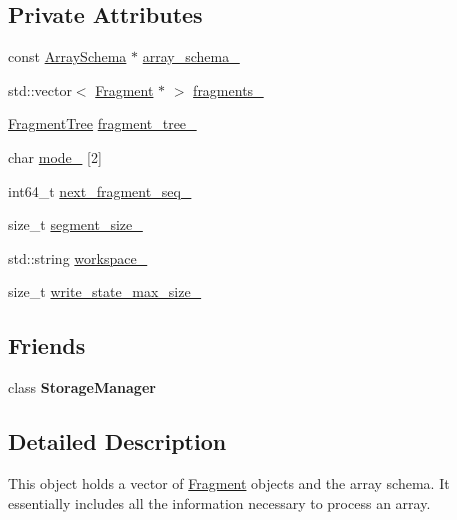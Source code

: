 \subsection*{Private Attributes}
\begin{DoxyCompactItemize}
\item 
const \hyperlink{classArraySchema}{Array\+Schema} $\ast$ \hyperlink{classStorageManager_1_1Array_a8be1e363617e535395c92993646a1ad1}{array\+\_\+schema\+\_\+}
\item 
std\+::vector$<$ \hyperlink{classStorageManager_1_1Fragment}{Fragment} $\ast$ $>$ \hyperlink{classStorageManager_1_1Array_ab5e894d3193e5e2fd08c0d183fc4ad9f}{fragments\+\_\+}
\item 
\hyperlink{classStorageManager_ae54ce8d35b2528bd55505b40ae62a222}{Fragment\+Tree} \hyperlink{classStorageManager_1_1Array_a6b69e56370842f04f1c077e142f4f0b5}{fragment\+\_\+tree\+\_\+}
\item 
char \hyperlink{classStorageManager_1_1Array_a57ab3dcdbc1bc536390fc64a35dccf00}{mode\+\_\+} \mbox{[}2\mbox{]}
\item 
int64\+\_\+t \hyperlink{classStorageManager_1_1Array_a4f3b670bdd10b8e72bc560d1357622ab}{next\+\_\+fragment\+\_\+seq\+\_\+}
\item 
size\+\_\+t \hyperlink{classStorageManager_1_1Array_a5af267d88338c68aee3fc7586b063bf0}{segment\+\_\+size\+\_\+}
\item 
std\+::string \hyperlink{classStorageManager_1_1Array_ad83e2d64d928cb81ccd29c87a91d5c90}{workspace\+\_\+}
\item 
size\+\_\+t \hyperlink{classStorageManager_1_1Array_a84d19e5428f5c04b63d294acd5fa71d6}{write\+\_\+state\+\_\+max\+\_\+size\+\_\+}
\end{DoxyCompactItemize}
\subsection*{Friends}
\begin{DoxyCompactItemize}
\item 
\hypertarget{classStorageManager_1_1Array_aab928c97ba2ed82b71fb011b1c4fef74}{}class {\bfseries Storage\+Manager}\label{classStorageManager_1_1Array_aab928c97ba2ed82b71fb011b1c4fef74}

\end{DoxyCompactItemize}


\subsection{Detailed Description}
This object holds a vector of \hyperlink{classStorageManager_1_1Fragment}{Fragment} objects and the array schema. It essentially includes all the information necessary to process an array. 

